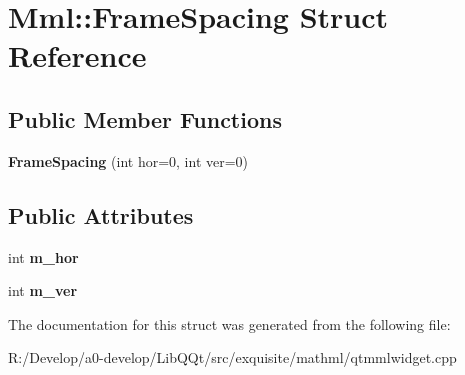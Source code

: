 \hypertarget{struct_mml_1_1_frame_spacing}{}\section{Mml\+:\+:Frame\+Spacing Struct Reference}
\label{struct_mml_1_1_frame_spacing}
\subsection*{Public Member Functions}
\begin{DoxyCompactItemize}
\item 
\mbox{\label{struct_mml_1_1_frame_spacing_a66836c0c6cb4784858003dec4edfee82}} 
{\bfseries Frame\+Spacing} (int hor=0, int ver=0)
\end{DoxyCompactItemize}
\subsection*{Public Attributes}
\begin{DoxyCompactItemize}
\item 
\mbox{\label{struct_mml_1_1_frame_spacing_ac7dc52d80431bac426f0a2c0c87c3575}} 
int {\bfseries m\+\_\+hor}
\item 
\mbox{\label{struct_mml_1_1_frame_spacing_a3d9d7c77de83d7f3ad913f3d11d8ceff}} 
int {\bfseries m\+\_\+ver}
\end{DoxyCompactItemize}


The documentation for this struct was generated from the following file\+:\begin{DoxyCompactItemize}
\item 
R\+:/\+Develop/a0-\/develop/\+Lib\+Q\+Qt/src/exquisite/mathml/qtmmlwidget.\+cpp\end{DoxyCompactItemize}
